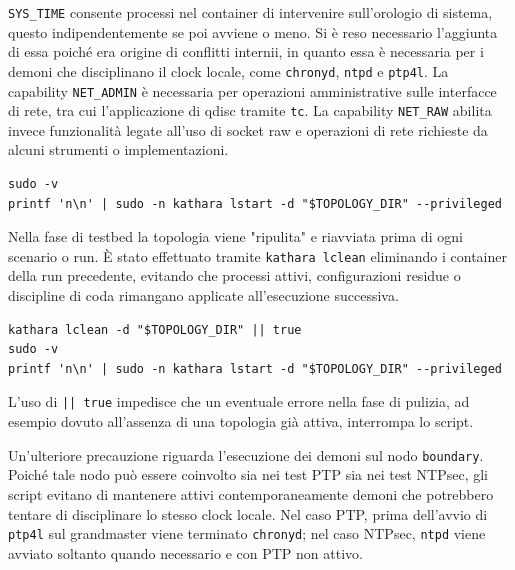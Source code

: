 \texttt{SYS\_TIME} consente processi nel container di intervenire sull'orologio di
sistema, questo indipendentemente se poi avviene o meno. Si è reso necessario l'aggiunta
di essa poiché era origine di conflitti internii, in quanto essa è necessaria
per i demoni che disciplinano il clock locale, come \texttt{chronyd}, \texttt{ntpd}
e \texttt{ptp4l}. La capability \texttt{NET\_ADMIN} è necessaria per operazioni amministrative
sulle interfacce di rete, tra cui l'applicazione di qdisc tramite \texttt{tc}.
La capability \texttt{NET\_RAW} abilita invece funzionalità legate all'uso di socket
raw e operazioni di rete richieste da alcuni strumenti o implementazioni.

\begin{listing}[H]
\begin{verbatim}
sudo -v
printf 'n\n' | sudo -n kathara lstart -d "$TOPOLOGY_DIR" --privileged
\end{verbatim}
\caption{Avvio privilegiato della topologia nello script di automazione.}
\label{lst:kathara_privileged}
\end{listing}

Nella fase di testbed la topologia viene "ripulita" e riavviata prima di ogni
scenario o run. È stato effettuato tramite \texttt{kathara lclean} eliminando i
container della run precedente, evitando che processi attivi, configurazioni
residue o discipline di coda rimangano applicate all'esecuzione successiva.

\begin{listing}[H]
\begin{verbatim}
kathara lclean -d "$TOPOLOGY_DIR" || true
sudo -v
printf 'n\n' | sudo -n kathara lstart -d "$TOPOLOGY_DIR" --privileged
\end{verbatim}
\caption{Reset della topologia prima dell'avvio di una run.}
\label{lst:kathara_lclean}
\end{listing}

L'uso di \texttt{|| true} impedisce che un eventuale errore nella fase di
pulizia, ad esempio dovuto all'assenza di una topologia già attiva, interrompa
lo script.

Un'ulteriore precauzione riguarda l'esecuzione dei demoni sul nodo \texttt{boundary}.
Poiché tale nodo può essere coinvolto sia nei test PTP sia nei test NTPsec, gli script
evitano di mantenere attivi contemporaneamente demoni che potrebbero tentare di disciplinare
lo stesso clock locale. Nel caso PTP, prima dell'avvio di \texttt{ptp4l} sul
grandmaster viene terminato \texttt{chronyd}; nel caso NTPsec, \texttt{ntpd}
viene avviato soltanto quando necessario e con PTP non attivo.

